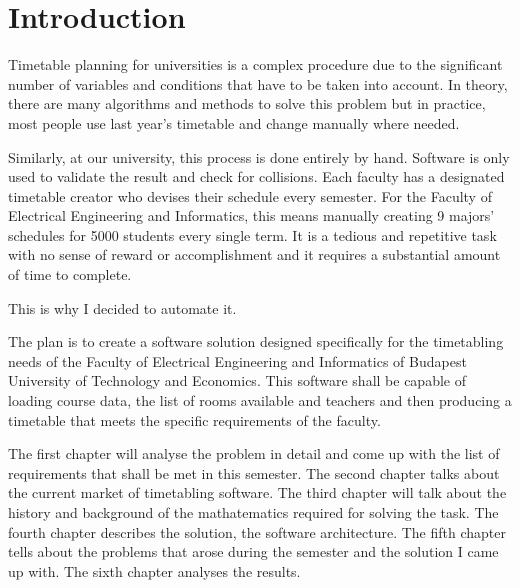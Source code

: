 \chapter*{Introduction}

Timetable planning for universities is a complex procedure due to the significant number of variables and conditions that have to be taken into account. In theory, there are many algorithms and methods to solve this problem but in practice, most people use last year's timetable and change manually where needed.

Similarly, at our university, this process is done entirely by hand. Software is only used to validate the result and check for collisions. Each faculty has a designated timetable creator who devises their schedule every semester. For the Faculty of Electrical Engineering and Informatics, this means manually creating 9 majors' schedules for 5000 students every single term. It is a tedious and repetitive task with no sense of reward or accomplishment and it requires a substantial amount of time to complete.

This is why I decided to automate it.

The plan is to create a software solution designed specifically for the timetabling needs of the Faculty of Electrical Engineering and Informatics of Budapest University of Technology and Economics. This software shall be capable of loading course data, the list of rooms available and teachers and then producing a timetable that meets the specific requirements of the faculty.

The first chapter will analyse the problem in detail and come up with the list of requirements that shall be met in this semester. The second chapter talks about the current market of timetabling software. The third chapter will talk about the history and background of the mathatematics required for solving the task. The fourth chapter describes the solution, the software architecture. The fifth chapter tells about the problems that arose during the semester and the solution I came up with. The sixth chapter analyses the results.
